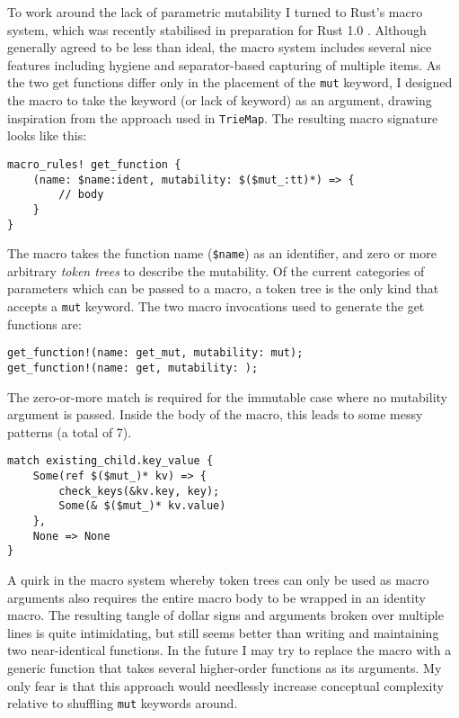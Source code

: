 \documentclass[a4paper,12pt]{article}
\newcommand{\code}[1]{\texttt{#1}}
\begin{document}
To work around the lack of parametric mutability I turned to Rust's macro system, which was recently stabilised in preparation for Rust 1.0 \cite{macro-reform-rfc}. Although generally agreed to be less than ideal, the macro system includes several nice features including hygiene and separator-based capturing of multiple items. As the two get functions differ only in the placement of the \code{mut} keyword, I designed the macro to take the keyword (or lack of keyword) as an argument, drawing inspiration from the approach used in \code{TrieMap}. The resulting macro signature looks like this:

\begin{verbatim}
macro_rules! get_function {
    (name: $name:ident, mutability: $($mut_:tt)*) => {
        // body
    }
}
\end{verbatim}

The macro takes the function name (\code{\$name}) as an identifier, and zero or more arbitrary \textit{token trees} to describe the mutability. Of the current categories of parameters which can be passed to a macro, a token tree is the only kind that accepts a \code{mut} keyword. The two macro invocations used to generate the get functions are:

\begin{verbatim}
get_function!(name: get_mut, mutability: mut);
get_function!(name: get, mutability: );
\end{verbatim}

The zero-or-more match is required for the immutable case where no mutability argument is passed. Inside the body of the macro, this leads to some messy patterns (a total of 7).

\begin{verbatim}
match existing_child.key_value {
    Some(ref $($mut_)* kv) => {
        check_keys(&kv.key, key);
        Some(& $($mut_)* kv.value)
    },
    None => None
}
\end{verbatim}

A quirk in the macro system whereby token trees can only be used as macro arguments also requires the entire macro body to be wrapped in an identity macro. The resulting tangle of dollar signs and arguments broken over multiple lines is quite intimidating, but still seems better than writing and maintaining two near-identical functions. In the future I may try to replace the macro with a generic function that takes several higher-order functions as its arguments. My only fear is that this approach would needlessly increase conceptual complexity relative to shuffling \code{mut} keywords around.
\end{document}

